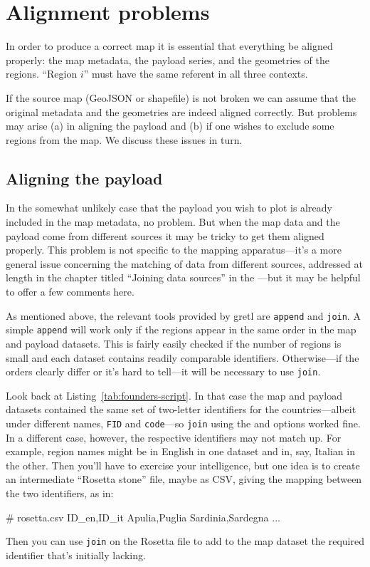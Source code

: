\documentclass{article}
\begin{document}
\section{Alignment problems}
\label{sec:pairing}

In order to produce a correct map it is essential that everything be
aligned properly: the map metadata, the payload series, and the
geometries of the regions. ``Region $i$'' must have the same referent
in all three contexts.

If the source map (GeoJSON or shapefile) is not broken we can assume
that the original metadata and the geometries are indeed aligned
correctly. But problems may arise (a) in aligning the payload and (b)
if one wishes to exclude some regions from the map. We discuss these
issues in turn.

\subsection{Aligning the payload}

In the somewhat unlikely case that the payload you wish to plot is
already included in the map metadata, no problem. But when the map
data and the payload come from different sources it may be tricky to
get them aligned properly. This problem is not specific to the mapping
apparatus---it's a more general issue concerning the matching of data
from different sources, addressed at length in the chapter titled
``Joining data sources'' in the \GUG{}---but it may be helpful to
offer a few comments here.

As mentioned above, the relevant tools provided by gretl are
\texttt{append} and \texttt{join}. A simple \texttt{append} will work
only if the regions appear in the same order in the map and payload
datasets. This is fairly easily checked if the number of regions is
small and each dataset contains readily comparable
identifiers. Otherwise---if the orders clearly differ or it's hard to
tell---it will be necessary to use \texttt{join}.

Look back at Listing~\ref{tab:founders-script}. In that case the map
and payload datasets contained the same set of two-letter identifiers
for the countries---albeit under different names, \texttt{FID} and
\texttt{code}---so \texttt{join} using the  and
 options worked fine. In a different case, however, the
respective identifiers may not match up. For example, region names
might be in English in one dataset and in, say, Italian in the
other. Then you'll have to exercise your intelligence, but one idea is
to create an intermediate ``Rosetta stone'' file, maybe as CSV, giving
the mapping between the two identifiers, as in:
\begin{code}
# rosetta.csv
ID_en,ID_it
Apulia,Puglia
Sardinia,Sardegna
...
\end{code}
Then you can use \texttt{join} on the Rosetta file to add to the map
dataset the required identifier that's initially lacking.
\end{document}
